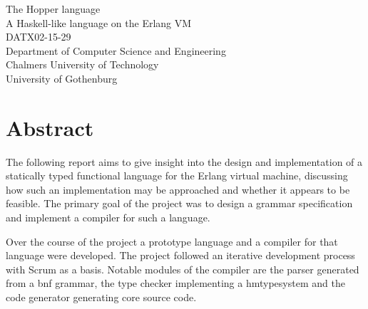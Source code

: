 The Hopper language\\
A Haskell-like language on the Erlang VM\\
DATX02-15-29\\
Department of Computer Science and Engineering\\
Chalmers University of Technology\\
University of Gothenburg\\

\thispagestyle{plain}			%

\setlength{\parindent}{15pt}

\section*{Abstract}





The following report aims to give insight into the design and implementation of a statically typed functional language for the Erlang virtual machine, discussing how such an implementation may be approached and whether it appears to be feasible. The primary goal of the project was to design a grammar specification and implement a compiler for such a language.


Over the course of the project a prototype language and a compiler for that language were developed. The project followed an iterative development process with Scrum as a basis. Notable modules of the compiler are the parser generated from a \acrshort{bnf} grammar, the type checker implementing a \gls{hmtypesystem} and the code generator generating \gls{core} source code.

% 


